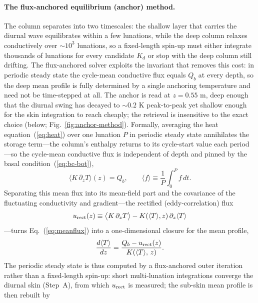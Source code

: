 \documentclass[11pt]{article}
\begin{document}
\paragraph*{The flux-anchored equilibrium (anchor) method.}
The column separates into two timescales: the shallow layer that
carries the diurnal wave equilibrates within a few lunations, while the
deep column relaxes conductively over ${\sim}10^{3}$ lunations, so a
fixed-length spin-up must either integrate thousands of lunations for
every candidate $K_d$ or stop with the deep column still drifting. The
flux-anchored solver exploits the invariant that removes this cost: in
periodic steady state the cycle-mean conductive flux equals $Q_b$ at
every depth, so the deep mean profile is fully determined by a single
anchoring temperature and need not be time-stepped at all. The anchor
is read at $z=0.55$ m, deep enough that the diurnal swing has
decayed to ${\sim}0.2$ K peak-to-peak yet shallow enough for the skin integration
to reach cheaply; the retrieval is insensitive to the exact choice
(below; Fig.~\ref{fig:anchor-method}). Formally, averaging the heat equation~(\ref{eq:heat}) over one lunation
$P$ in periodic steady state annihilates the storage term---the
column's enthalpy returns to its cycle-start value each period---so the
cycle-mean conductive flux is independent of depth and pinned by the
basal condition~(\ref{eq:bc-bot}),
\begin{equation}
  \bigl\langle K\,\partial_z T\bigr\rangle(z) = Q_b,
  \qquad
  \langle f\rangle \equiv \frac{1}{P}\int_0^{P}\! f\,dt .
  \label{eq:meanflux}
\end{equation}
Separating this mean flux into its mean-field part and the covariance of
the fluctuating conductivity and gradient---the rectified
(eddy-correlation) flux
\begin{equation}
  u_{\rm rect}(z) \equiv
     \bigl\langle K\,\partial_z T\bigr\rangle
     - K(\langle T\rangle,z)\,\partial_z\langle T\rangle
  \label{eq:urect}
\end{equation}
---turns Eq.~(\ref{eq:meanflux}) into a one-dimensional closure for the
mean profile,
\begin{equation}
  \frac{d\langle T\rangle}{dz}
     = \frac{Q_b - u_{\rm rect}(z)}{K(\langle T\rangle,\,z)} .
  \label{eq:closure}
\end{equation}
The periodic steady state is thus computed by a flux-anchored outer
iteration rather than a fixed-length spin-up: short multi-lunation
integrations converge the diurnal skin (Step~A), from which
$u_{\rm rect}$ is measured; the sub-skin mean profile is then rebuilt by
\end{document}
